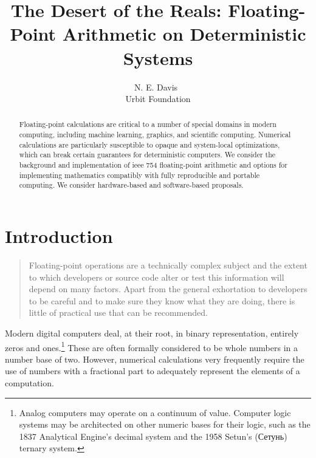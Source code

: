 \documentclass[twoside]{article}
\title{The Desert of the Reals:  Floating-Point Arithmetic on Deterministic Systems}
\author{N. E. Davis~\patp{lagrev-nocfep} \\ Urbit Foundation}
\date{}
\begin{document}
\maketitle
\thispagestyle{firststyle}

\begin{abstract}
\noindent \sloppy
Floating-point calculations are critical to a number of special domains in modern computing, including machine learning, graphics, and scientific computing.  Numerical calculations are particularly susceptible to opaque and system-local optimizations, which can break certain guarantees for deterministic computers.  We consider the background and implementation of {\sc ieee} 754 floating-point arithmetic and options for implementing mathematics compatibly with fully reproducible and portable computing.  We consider hardware-based and software-based proposals.
\end{abstract}

\setcounter{page}{93}

\tableofcontents

\section{Introduction}

\begin{quote}
Floating-point operations are a technically complex subject and the extent to which developers or source code alter or test this information will depend on many factors. Apart from the general exhortation to developers to be careful and to make sure they know what they are doing, there is little of practical use that can be recommended.  \citetext{\citet{Jones2008}, p.~197}
\end{quote}

Modern digital computers deal, at their root, in binary representation, entirely zeros and ones.\footnote{Analog computers may operate on a continuum of value.  Computer logic systems may be architected on other numeric bases for their logic, such as the 1837 Analytical Engine's decimal system and the 1958 Setun's (Сетунь) ternary system.}  These are often formally considered to be whole numbers in a number base of two.  However, numerical calculations very frequently require the use of numbers with a fractional part to adequately represent the elements of a computation.
\end{document}
